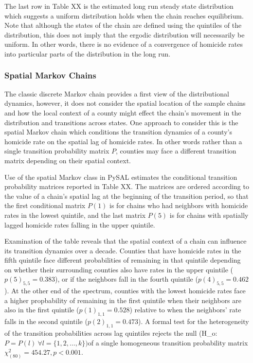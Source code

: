 \documentclass[11pt, titlepage]{article}
\begin{document}
The last row in Table XX is the estimated long run steady state
distribution which suggests a uniform distribution holds when the chain
reaches equilibrium. Note that although the states of the chain are
defined using the quintiles of the distribution, this does not imply
that the ergodic distribution will necessarily be uniform. In other
words, there is no evidence of a convergence of homicide rates into
particular parts of the distribution in the long run.

\subsubsection{Spatial Markov Chains}

The classic discrete Markov chain provides a first view of the
distributional dynamics, however, it does not consider the spatial
location of the sample chains and how the local context of a county
might effect the chain's movement in the distribution and transitions
across states. One approach to consider this is the spatial Markov chain
which conditions the transition dynamics of a county's homicide rate on
the spatial lag of homicide rates. In other words rather than a single
transition probability matrix $P$, counties may face a different
transition matrix depending on their spatial context.

Use of the spatial Markov class in PySAL estimates the conditional
transition probability matrices reported in Table XX. The matrices are
ordered according to the value of a chain's spatial lag at the beginning
of the transition period, so that the first conditional matrix $P(1)$ is
for chains who had neighbors with homicide rates in the lowest quintile,
and the last matrix $P(5)$ is for chains with spatially lagged homicide
rates falling in the upper quintile.

Examination of the table reveals that the spatial context of a chain can
influence its transition dynamics over a decade. Counties that have
homicide rates in the fifth quintile face different probabilities of
remaining in that quintile depending on whether their surrounding
counties also have rates in the upper quintile ($p(5)_{5,5} = 0.383$),
or if the neighbors fall in the fourth quintile ($p(4)_{5,5}=0.462$). At
the other end of the spectrum, counties with the lowest homicide rates
face a higher propbability of remaining in the first quintile when their
neighbors are also in the first quintile ($p(1)_{1,1}=0.528$) relative
to when the neighbors' rate falls in the second quintile
($p(2)_{1,1}=0.473$). A formal test for the heterogeneity of the
transition probabilities across lag quintiles rejects the null (H\_o:
$P=P(l) \ \forall l=\{1,2,\ldots,k\})$of a single homogeneous transition
probability matrix $\chi_{(80)}^2=454.27, p<0.001$.
\end{document}
